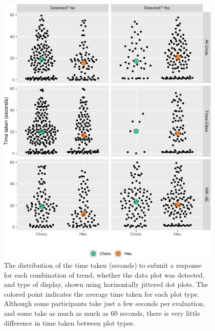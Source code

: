 \documentclass[journal]{vgtc}                     %
\begin{document}
\begin{figure}
\includegraphics[width=1\linewidth]{paper_files/figure-latex/beeswarm-1} \caption{The distribution of the time taken (seconds) to submit a response for each combination of trend, whether the data plot was detected, and type of display, shown using horizontally jittered dot plots. The colored point indicates the average time taken for each plot type. Although some participants take just a few seconds per evaluation, and some take as much as much as 60 seconds, there is very little difference in time taken between plot types.}\label{fig:beeswarm}
\end{figure}
\end{document}
